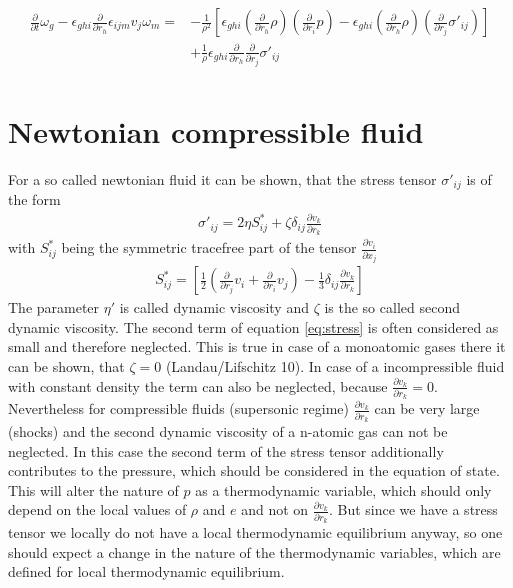 \documentclass[a4paper,
					fontsize=12pt,
					twoside,
					pagesize,
					cleardoublepage=plain,
					headsepline,
					bibliography=totoc
					]{scrbook}
\newcommand{\lra}[1]{{ \left( #1 \right) }}
\newcommand{\lrb}[1]{{ \left[ #1 \right] }}
\newcommand{\pd}[1]{\frac{\partial}{\partial #1}}
\newcommand{\ppd}[2]{\frac{\partial #2}{\partial #1}}
\begin{document}
\begin{align}
\begin{split}
\pd{t}\omega_g
-\epsilon_{ghi}\pd{r_h} \epsilon_{ijm} v_j \omega_m =
&-\frac{1}{\rho^2}\lrb{
\epsilon_{ghi} \lra{\pd{r_h}\rho} \lra{\pd{r_i}p}
-\epsilon_{ghi} \lra{\pd{r_h}\rho} \lra{\pd{r_j}\sigma'_{ij}}}\\
&+\frac{1}{\rho}\epsilon_{ghi}\pd{r_h}\pd{r_j}\sigma'_{ij}
\end{split}
\label{eq:vort}
\end{align}

\chapter{Newtonian compressible fluid}
For a so called newtonian fluid it can be shown, that the stress tensor
$\sigma'_{ij}$ is of the form
\begin{align}
\sigma'_{ij}=2\eta S^*_{ij}+\zeta \delta_{ij}\ppd{r_k}{v_k}
\label{eq:stress}
\end{align}
with $S^*_{ij}$ being the symmetric tracefree part of the tensor
$\ppd{x_j}{v_i}$
\begin{align}
S^*_{ij}=\lrb{\frac{1}{2}\lra{\pd{r_j}v_i+\pd{r_i}v_j}-\frac{1}{3}\delta_{ij}
\ppd{r_k}{v_k}}
\end{align}
The parameter $\eta'$ is called dynamic viscosity and $\zeta$ is the so called
second dynamic viscosity. The second term of equation \eqref{eq:stress} is
often considered as small and therefore neglected. This is true in case of a
monoatomic gases there it can be shown, that $\zeta=0$ (Landau/Lifschitz 10).
In case of a incompressible fluid with constant density the term can also be
neglected, because $\ppd{r_k}{v_k} = 0$. Nevertheless for compressible fluids
(supersonic regime) $\ppd{r_k}{v_k}$ can be very large (shocks) and the second
dynamic viscosity of a n-atomic gas can not be neglected. In this case the
second term of the stress tensor additionally contributes to the pressure,
which should be considered in the equation of state. This will alter the nature
of $p$ as a thermodynamic variable, which should only depend on the local values
of $\rho$ and $e$ and not on $\ppd{r_k}{v_k}$. But since we have a stress tensor
we locally do not have a local thermodynamic equilibrium anyway, so one should
expect a change in the nature of the thermodynamic variables, which are
defined for local thermodynamic equilibrium.
\end{document}
